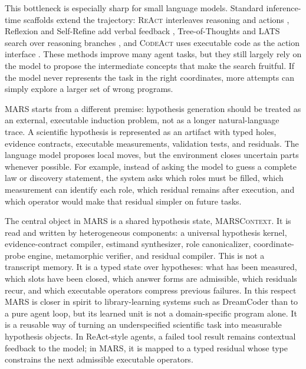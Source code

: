 \documentclass[letterpaper]{article}
\newcommand{\mars}{\textsc{MARS}\xspace}
\newcommand{\react}{\textsc{ReAct}\xspace}
\newcommand{\codeact}{\textsc{CodeAct}\xspace}
\begin{document}
This bottleneck is especially sharp for small language models. Standard
inference-time scaffolds extend the trajectory: \react interleaves reasoning
and actions \citep{react}, Reflexion and Self-Refine add verbal feedback
\citep{reflexion,selfrefine}, Tree-of-Thoughts and LATS search over reasoning
branches \citep{tot,lats}, and \codeact uses executable code as the action
interface \citep{codeact}. These methods improve many agent tasks, but they
still largely rely on the model to propose the intermediate concepts that make
the search fruitful. If the model never represents the task in the right
coordinates, more attempts can simply explore a larger set of wrong programs.

\mars starts from a different premise: hypothesis generation should be treated
as an external, executable induction problem, not as a longer natural-language
trace. A scientific hypothesis is represented as an artifact with typed holes,
evidence contracts, executable measurements, validation tests, and residuals.
The language model proposes local moves, but the environment closes uncertain
parts whenever possible. For example, instead of asking the model to guess a
complete law or discovery statement, the system asks which roles must be filled,
which measurement can identify each role, which residual remains after
execution, and which operator would make that residual simpler on future tasks.

The central object in \mars is a shared hypothesis state, \textsc{MARSContext}.
It is read and written by heterogeneous components: a universal hypothesis
kernel, evidence-contract compiler, estimand synthesizer, role canonicalizer,
coordinate-probe engine, metamorphic verifier, and residual compiler. This is
not a transcript memory. It is a typed state over hypotheses: what has been
measured, which slots have been closed, which answer forms are admissible,
which residuals recur, and which executable operators compress previous
failures. In this respect \mars is closer in spirit to library-learning systems
such as DreamCoder \citep{dreamcoder} than to a pure agent loop, but its learned
unit is not a domain-specific program alone. It is a reusable way of
turning an underspecified scientific task into measurable hypothesis objects.
In ReAct-style agents, a failed tool result remains contextual feedback to the
model; in \mars, it is mapped to a typed residual whose type constrains the
next admissible executable operators.
\end{document}
